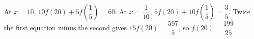 At $x=10$, $10f(20)+5f(\dfrac{1}{5})=60$. At $x=\dfrac{1}{10}$, $5f(20)+10f(\dfrac{1}{5})=\dfrac{3}{5}$. Twice the first equation minus the second gives $15f(20)=\dfrac{597}{5}$, so $\boxed{f(20)=\dfrac{199}{25}}$.
